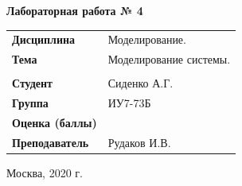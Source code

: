 \documentclass[a4paper,14pt]{extreport} %
\begin{document}
\begin{titlepage}
    \vspace{2cm}

    \begin{center}
        \textbf{Лабораторная работа № 4} \\
        \vspace{0.5cm}
    \end{center}

    \vspace{4cm}

    \begin{flushleft}
        \begin{tabular}{ll}
            \textbf{Дисциплина} & Моделирование.  \\
            \textbf{Тема} & Моделирование системы.  \\
            \\
            \textbf{Студент} & Сиденко А.Г. \\
            \textbf{Группа} & ИУ7-73Б \\
            \textbf{Оценка (баллы)} & \\
            \textbf{Преподаватель} & Рудаков И.В.   \\
        \end{tabular}
    \end{flushleft}

    \vspace{4cm}

   \begin{center}
        Москва, 2020 г.
    \end{center}

\end{titlepage}
\end{document}
